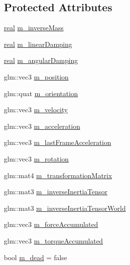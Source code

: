 \subsection*{Protected Attributes}
\begin{DoxyCompactItemize}
\item 
\hyperlink{namespacerum_a7e8cca23573d5eaead0f138cbaa4862c}{real} \hyperlink{classrum_1_1_rigid_body_ae44a097e5f506fa92b4362fb7f3d1e34}{m\+\_\+inverse\+Mass}
\item 
\hyperlink{namespacerum_a7e8cca23573d5eaead0f138cbaa4862c}{real} \hyperlink{classrum_1_1_rigid_body_a1d4bf555e6b2f2bb856d4e0d54ee7578}{m\+\_\+linear\+Damping}
\item 
\hyperlink{namespacerum_a7e8cca23573d5eaead0f138cbaa4862c}{real} \hyperlink{classrum_1_1_rigid_body_ae4da76f319cb35a3d9c98ca3b6a49978}{m\+\_\+angular\+Damping}
\item 
glm\+::vec3 \hyperlink{classrum_1_1_rigid_body_a6ebb914d867b2ed3199a7917bf8a4b26}{m\+\_\+position}
\item 
glm\+::quat \hyperlink{classrum_1_1_rigid_body_ad6a5781f0de7e6389c4d77ed9b35d36a}{m\+\_\+orientation}
\item 
glm\+::vec3 \hyperlink{classrum_1_1_rigid_body_a48ac9b6ee9e5b953e811b9d53b5152c4}{m\+\_\+velocity}
\item 
glm\+::vec3 \hyperlink{classrum_1_1_rigid_body_a6ac55e43c61722e4cba0dac0a0a703b3}{m\+\_\+acceleration}
\item 
glm\+::vec3 \hyperlink{classrum_1_1_rigid_body_a781351881377ba7e431191d2c1967c7b}{m\+\_\+last\+Frame\+Acceleration}
\item 
glm\+::vec3 \hyperlink{classrum_1_1_rigid_body_ab28218707fc017407491826bb40a06e5}{m\+\_\+rotation}
\item 
glm\+::mat4 \hyperlink{classrum_1_1_rigid_body_ad3a0b17141b70e55f03a713f3892100e}{m\+\_\+transformation\+Matrix}
\item 
glm\+::mat3 \hyperlink{classrum_1_1_rigid_body_a2d280d2c778fe82a303d8495a71b3470}{m\+\_\+inverse\+Inertia\+Tensor}
\item 
glm\+::mat3 \hyperlink{classrum_1_1_rigid_body_a2d1996a62209043fe5c43a5bc275f912}{m\+\_\+inverse\+Inertia\+Tensor\+World}
\item 
glm\+::vec3 \hyperlink{classrum_1_1_rigid_body_a7e38f8a99d5dd102ea8496814048bcc0}{m\+\_\+force\+Accumulated}
\item 
glm\+::vec3 \hyperlink{classrum_1_1_rigid_body_a9d879f2a5d1430d4c16931bc6b96459d}{m\+\_\+torque\+Accumulated}
\item 
bool \hyperlink{classrum_1_1_rigid_body_aeca9c644919b9a8974e016cc1e8b9e71}{m\+\_\+dead} = false
\end{DoxyCompactItemize}


